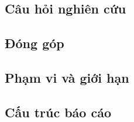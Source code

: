 \subsection{Câu hỏi nghiên cứu}

\subsection{Đóng góp}

\subsection{Phạm vi và giới hạn}

\subsection{Cấu trúc báo cáo}
